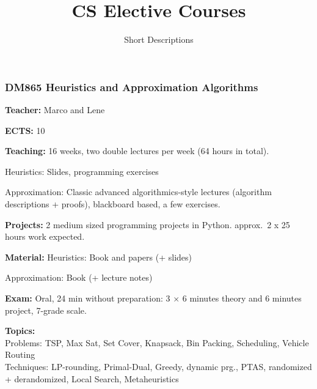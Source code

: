 \documentclass[10pt]{beamer}
\title{CS Elective Courses}
\author{Short Descriptions}
\date{}
\begin{document}

\frame{\titlepage}



\frame
{
  \frametitle{DM865 Heuristics and Approximation Algorithms}

  \textbf{Teacher:} Marco and Lene

  \textbf{ECTS:} 10
  
  \textbf{Teaching:} 16 weeks, two double lectures per week (64 hours
  in total).

  Heuristics: Slides, programming exercises

  Approximation:
  Classic advanced algorithmics-style lectures (algorithm
  descriptions + proofs), blackboard based, a few exercises.

  \textbf{Projects:} 2 medium sized programming projects in
  Python. approx.\ 2 x 25 hours work expected.
 
  \textbf{Material:}
  Heuristics: Book and papers (+ slides)
  
  Approximation: Book (+ lecture notes)

  \textbf{Exam:} Oral, 24 min without preparation: 3 $\times$ 6 minutes theory and 6 minutes project, 7-grade scale.


\textbf{Topics:}\\
   {\color{gray} Problems: TSP, Max Sat, Set Cover, Knapsack, Bin Packing, Scheduling, Vehicle Routing}\\
   {\color{gray} Techniques: LP-rounding, Primal-Dual, Greedy, dynamic prg., PTAS, randomized + derandomized, Local Search, Metaheuristics}
}
\end{document}
